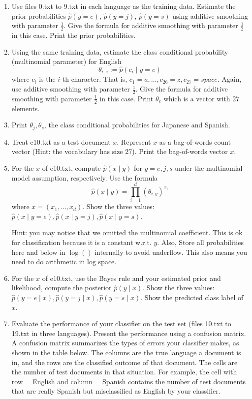 \documentclass[a4paper]{article}
\theoremstyle{definition}
\begin{document}
\begin{enumerate}
\item
Use files 0.txt to 9.txt in each language as the training data.
Estimate the prior probabilities 
$\hat p(y=e)$,
$\hat p(y=j)$,
$\hat p(y=s)$
using additive smoothing with parameter $\frac{1}{2}$. 
Give the formula for additive smoothing with parameter $\frac{1}{2}$ in this case. 
Print the prior probabilities.

\item
Using the same training data, estimate the class conditional probability (multinomial parameter) for English
$$\theta_{i,e} := \hat p(c_i \mid y=e)$$ 
where $c_i$ is the $i$-th character. That is, $c_1 = a, \ldots, c_{26} = z, c_{27} = space$.
Again, use additive smoothing with parameter $\frac{1}{2}$.
Give the formula for additive smoothing with parameter $\frac{1}{2}$ in this case. 
Print $\theta_e$ which is a vector with 27 elements.

\item
Print $\theta_j, \theta_s$, the class conditional probabilities for Japanese and Spanish.

\item
Treat e10.txt as a test document $x$.
Represent $x$ as a bag-of-words count vector (Hint: the vocabulary has size 27).
Print the bag-of-words vector $x$.

\item
For the $x$ of e10.txt, compute $\hat p(x \mid y)$ for $y=e, j, s$ under the multinomial model assumption, respectively.
Use the formula
$$\hat p(x \mid y) = \prod_{i=1}^d (\theta_{i, y})^{x_i}$$
where $x=(x_1, \ldots, x_d)$.
Show the three values: $\hat p(x \mid y=e), \hat p(x \mid y=j), \hat p(x \mid y=s)$.

Hint: you may notice that we omitted the multinomial coefficient.  This is ok for classification because it is a constant w.r.t. $y$. Also, Store all probabilities here and below in $\log()$ internally to avoid underflow. This also means you need to do arithmetic in log space. 

\item
For the $x$ of e10.txt, use the Bayes rule and your estimated prior and likelihood, compute the posterior $\hat p(y \mid x)$.
Show the three values: $\hat p(y=e \mid x), \hat p(y=j \mid x), \hat p(y=s \mid x)$.
Show the predicted class label of $x$.

\item
Evaluate the performance of your classifier on the test set (files 10.txt to 19.txt in three languages).
Present the performance using a confusion matrix. A confusion matrix summarizes the types of errors your classifier makes, as shown in the table below.   The columns are the true language a document is in, and the rows are the classified outcome of that document.  The cells are the number of test documents in that situation.  For example, the cell with row = English and column = Spanish contains the number of test documents that are really Spanish but misclassified as English by your classifier.


\end{enumerate}
\end{document}
